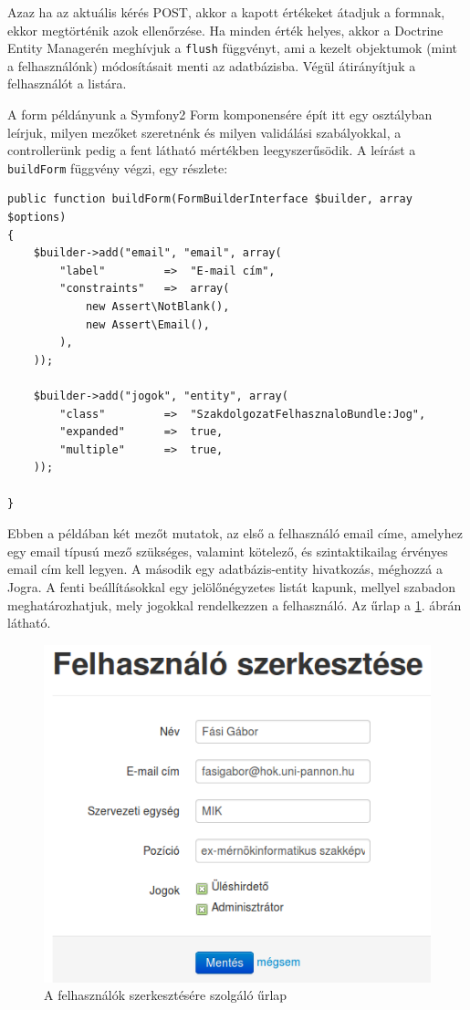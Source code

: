 \documentclass[a4paper,12pt,oneside]{report}
\begin{document}
Azaz ha az aktuális kérés POST, akkor a kapott értékeket átadjuk a formnak, ekkor megtörténik azok ellenőrzése. Ha minden érték helyes, akkor a Doctrine Entity Managerén meghívjuk a {\tt flush} függvényt, ami a kezelt objektumok (mint a felhasználónk) módosításait menti az adatbázisba. Végül átirányítjuk a felhasználót a listára.

A form példányunk a Symfony2 Form komponensére épít \textendash{} itt egy osztályban leírjuk, milyen mezőket szeretnénk és milyen validálási szabályokkal, a controllerünk pedig a fent látható mértékben leegyszerűsödik. A leírást a {\tt buildForm} függvény végzi, egy részlete:

\begin{lstlisting}
public function buildForm(FormBuilderInterface $builder, array $options)
{
    $builder->add("email", "email", array(
        "label"         =>  "E-mail cím",
        "constraints"   =>  array(
            new Assert\NotBlank(),
            new Assert\Email(),
        ),
    ));

    $builder->add("jogok", "entity", array(
        "class"         =>  "SzakdolgozatFelhasznaloBundle:Jog",
        "expanded"      =>  true,
        "multiple"      =>  true,
    ));

}
\end{lstlisting}

Ebben a példában két mezőt mutatok, az első a felhasználó email címe, amelyhez egy email típusú mező szükséges, valamint kötelező, és szintaktikailag érvényes email cím kell legyen. A második egy adatbázis-entity hivatkozás, méghozzá a Jogra. A fenti beállításokkal egy jelölőnégyzetes listát kapunk, mellyel szabadon meghatározhatjuk, mely jogokkal rendelkezzen a felhasználó. Az űrlap a \ref{fig:felhasznalo_szerkesztes}. ábrán látható.

\begin{figure}[h]
    \centering
    \includegraphics[width=.65\textwidth]{felhasznalo_szerkesztes.png}
    \caption{A felhasználók szerkesztésére szolgáló űrlap}
    \label{fig:felhasznalo_szerkesztes}
\end{figure}
\end{document}
